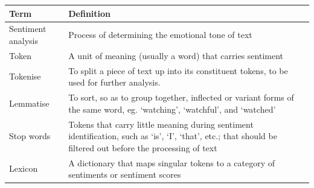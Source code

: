 \documentclass[12pt, bibliography=totocnumbered, paper=a4]{scrartcl}
\def\bf#1{\textbf{#1}}
\begin{document}
\begin{center}
	\begin{longtable}{|p{}|p{}|}
		\hline
		\bf{Term}                        & \bf{Definition}                                                                                                                                                                                                                                     \\
		\hline
		Sentiment analysis               & Process of determining the emotional tone of text                                                                                                                                                                                                   \\
		\hline
		Token                            & A unit of meaning (usually a word) that carries sentiment                                                                                                                                                                                           \\
		\hline
		Tokenise                         & To split a piece of text up into its constituent tokens, to be used for further analysis.                                                                                                                                                           \\
		\hline
		Lemmatise                        & To sort, so as to group together, inflected or variant forms of the same word, eg. `watching', `watchful', and `watched'                                                                                                                            \\
		\hline
		Stop words                       & Tokens that carry little meaning during sentiment identification, such as `is', `I', `that', etc.; that should be filtered out before the processing of text                                                                                        \\
		\hline
		Lexicon                          & A dictionary that maps singular tokens to a category of sentiments or sentiment scores                                                                                                                                                              \\

\end{longtable}
\end{center}
\end{document}
